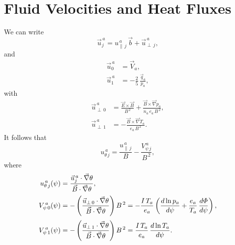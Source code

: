 \documentclass[12pt]{article}
\begin{document}
\section{Fluid Velocities and Heat Fluxes}
We can write
\begin{equation}
\vec{u}_j^{\,a} = u_{\parallel\,j}^{\,a}\,\vec{b} + \vec{u}_{\perp\,j}^{\,a},
\end{equation}
and 
\begin{align}
\vec{u}_0^{\,a} &= \vec{V}_a,\\[0.5ex]
\vec{u}_1^{\,a} &= - \frac{2}{5}\,\frac{\vec{q}_a}{p_a},
\end{align}
with 
\begin{align}
\vec{u}_{\perp\,0}^{\,a} &= \frac{\vec{E}\times \vec{B}}{B^{\,2}} + \frac{\vec{B}\times \vec{\nabla} p_a}{n_a\,e_a\,B^{\,2}},\\[0.5ex]
\vec{u}_{\perp\,1}^{\,a}&= - \frac{\vec{B}\times \vec{\nabla} T_a}{e_a\,B^{\,2}}.
\end{align}
It follows that
\begin{equation}\label{e24x}
u_{\theta\,j}^{\,a} = \frac{u_{\parallel\,j}^{\,a}}{B} - \frac{V_{\psi\,j}^{\,a}}{B^{\,2}},
\end{equation}
where
\begin{align}
u_{\theta\,j}^{\,a}(\psi) &= \frac{\vec{u}_j^{\,a}\cdot\vec{\nabla}\theta}{\vec{B}\cdot\vec{\nabla}\theta},\\[0.5ex]
V_{\psi\,0}^{\,a}(\psi) &=-\left( \frac{\vec{u}_{\perp\,0}\cdot\vec{\nabla}\theta}{\vec{B}\cdot\vec{\nabla}\theta}\right)B^{\,2}=
- \frac{I\,T_a}{e_a}\left(\frac{d \ln p_a}{d\psi}+\frac{e_a}{T_a}\,\frac{d{\mit\Phi}}{d\psi}\right),\\[0.5ex]
V_{\psi\,1}^{\,a}(\psi) &= -\left(\frac{\vec{u}_{\perp\,1}\cdot\vec{\nabla}\theta}{\vec{B}\cdot\vec{\nabla}\theta}\right)B^{\,2}=
\frac{I\,T_a}{e_a}\,\frac{d\ln T_a}{d\psi}.
\end{align}
\end{document}
